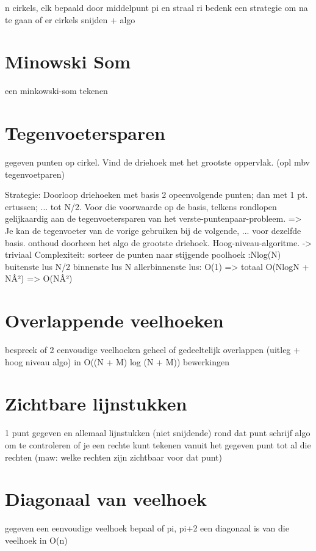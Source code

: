 \documentclass[12pt,a4paper]{article}
\begin{document}
n cirkels, elk bepaald door middelpunt pi en straal ri
bedenk een strategie om na te gaan of er cirkels snijden + algo

\section{Minowski Som}
een minkowski-som tekenen 

\section{Tegenvoetersparen}
gegeven punten op cirkel. Vind de driehoek met het grootste oppervlak.
(opl mbv tegenvoetparen) 


Strategie:
        Doorloop driehoeken met basis 2 opeenvolgende punten; dan met 1 pt. ertussen; ... tot N/2.
        Voor die voorwaarde op de basis, telkens rondlopen gelijkaardig aan de tegenvoetersparen van het verste-puntenpaar-probleem. => Je kan de tegenvoeter van de vorige gebruiken bij de volgende, ... voor dezelfde basis.
        onthoud doorheen het algo de grootste driehoek. 
    Hoog-niveau-algoritme. -> triviaal
    Complexiteit:
        sorteer de punten naar stijgende poolhoek :Nlog(N)
        buitenste lus N/2
        binnenste lus N
        allerbinnenste lus: O(1)
        => totaal O(NlogN + NÂ²) => O(NÂ²) 




\section{Overlappende veelhoeken}
bespreek of 2 eenvoudige veelhoeken geheel of gedeeltelijk overlappen (uitleg + hoog niveau algo)
in O((N + M) log (N + M)) bewerkingen 

\section{Zichtbare lijnstukken}
1 punt gegeven en allemaal lijnstukken (niet snijdende) rond dat punt
schrijf algo om te controleren of je een rechte kunt tekenen vanuit het gegeven punt tot al die rechten
(maw: welke rechten zijn zichtbaar voor dat punt) 

\section{Diagonaal van veelhoek}
gegeven een eenvoudige veelhoek
bepaal of pi, pi+2 een diagonaal is van die veelhoek in O(n) 
\end{document}
